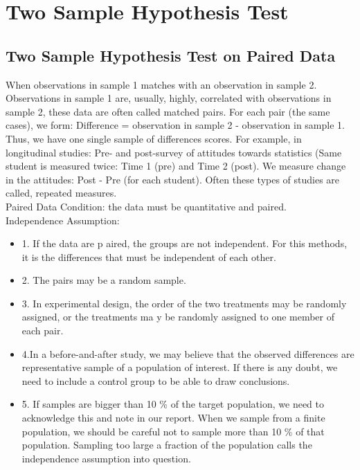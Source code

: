 \setcounter{chapter}{13}
\chapter{Two Sample Hypothesis Test}

\section{Two Sample Hypothesis Test on Paired Data}

When observations in sample 1 matches with an observation in sample 2. Observations in sample 1 are, usually, highly, correlated with observations in sample 2, these data are often called matched pairs. For each pair (the same cases), we form: Difference = observation in sample 2 - observation in sample 1. Thus, we have one single sample of differences scores. For example, in longitudinal studies: Pre- and post-survey of attitudes towards statistics (Same student is measured twice: Time 1 (pre) and Time 2 (post). We measure change in the attitudes: Post - Pre (for each student). Often these types of studies are called, repeated measures.\\

Paired Data Condition: the data must be quantitative and paired.\\

Independence Assumption:
\begin{itemize}
	\item 1. If the data are p aired, the groups are not independent. For this methods, it is the differences that must be independent of each other.
	\item 2. The pairs may be a random sample.
	\item 3. In experimental design, the order of the two treatments may be randomly assigned, or the treatments ma y be randomly assigned to one member of each pair.
	\item 4.In a before-and-after study, we may believe that the observed differences are representative sample of a population of interest. If there is any doubt, we need to include a control group to be able to draw conclusions.
	\item 5. If samples are bigger than 10 \% of the target population, we need to acknowledge this and note in our report. When we sample from a ﬁnite population, we should be careful not to sample more than 10 \% of that population. Sampling too large a fraction of the population calls the independence assumption into question.
\end{itemize}

